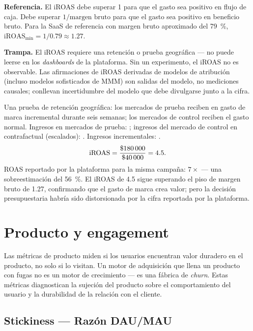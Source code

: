 \textbf{Referencia.} El iROAS debe superar 1 para que el gasto sea positivo en flujo de
caja. Debe superar $1/\text{margen bruto}$ para que el gasto sea positivo en beneficio bruto.
Para la SaaS de referencia con margen bruto aproximado del \qty{79}{\percent},
$\mathrm{iROAS}_{\min} = 1/0.79 \approx 1.27$.

\textbf{Trampa.} El iROAS requiere una retención o prueba geográfica --- no puede leerse en
los \emph{dashboards} de la plataforma. Sin un experimento, el iROAS no es observable. Las
afirmaciones de iROAS derivadas de modelos de atribución (incluso modelos sofisticados de
MMM) son salidas del modelo, no mediciones causales; conllevan incertidumbre del modelo que
debe divulgarse junto a la cifra.

\begin{example}
Una prueba de retención geográfica: los mercados de prueba reciben  en gasto de
marca incremental durante seis semanas; los mercados de control reciben el gasto normal.
Ingresos en mercados de prueba: ; ingresos del mercado de control en
contrafactual (escalados): . Ingresos incrementales: .
\[
  \mathrm{iROAS} = \frac{\$\num{180000}}{\$\num{40000}} = 4.5.
\]
ROAS reportado por la plataforma para la misma campaña: $7\times$ --- una sobreestimación del
\qty{56}{\percent}. El iROAS de 4.5 sigue superando el piso de margen bruto de 1.27,
confirmando que el gasto de marca crea valor; pero la decisión presupuestaria habría sido
distorsionada por la cifra reportada por la plataforma.
\end{example}


\section{Producto y engagement}

Las métricas de producto miden si los usuarios encuentran valor duradero en el producto, no
solo si lo visitan. Un motor de adquisición que llena un producto con fugas no es un motor
de crecimiento --- es una fábrica de \emph{churn}. Estas métricas diagnostican la sujeción
del producto sobre el comportamiento del usuario y la durabilidad de la relación con el
cliente.

\subsection{Stickiness --- Razón DAU/MAU}


